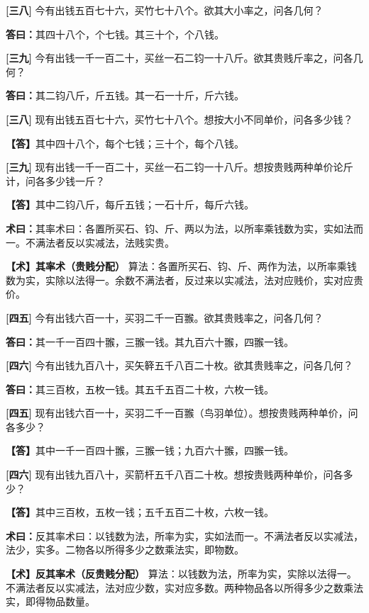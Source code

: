 \documentclass[10pt,a4paper]{article}
\newlength{\lw}
\newlength{\rw}
\newcommand{\bilingc}[2]{%
  \par\vspace{0.1em}%
  \noindent\begin{minipage}[t]{\lw}
  {\small #1}
  \end{minipage}%
  \hfill%
  \begin{minipage}[t]{\rw}
  {\small #2}
  \end{minipage}%
  \vspace{0.1em}%
}
\newcommand{\da}{\textbf{\textcolor{answercolor}{答曰：}}}
\newcommand{\daB}{\textbf{\textcolor{answercolor}{【答】}}}
\newcommand{\shu}{\textbf{\textcolor{methodcolor}{术曰：}}}
\newcommand{\shuB}{\textbf{\textcolor{methodcolor}{【术】}}}
\newcommand{\pn}[1]{\textbf{[#1]}}
\newcommand{\sk}{\vspace{0.1em}}
\begin{document}
\vspace{0.3em}

\bilingc{
\pn{三八} 今有出钱五百七十六，买竹七十八个。欲其大小率之，问各几何？

\da 其四十八个，个七钱。其三十个，个八钱。

\pn{三九} 今有出钱一千一百二十，买丝一石二钧一十八斤。欲其贵贱斤率之，问各几何？

\da 其二钧八斤，斤五钱。其一石一十斤，斤六钱。
}{
\pn{三八} 现有出钱五百七十六，买竹七十八个。想按大小不同单价，问各多少钱？

\daB 其中四十八个，每个七钱；三十个，每个八钱。

\pn{三九} 现有出钱一千一百二十，买丝一石二钧一十八斤。想按贵贱两种单价论斤计，问各多少钱一斤？

\daB 其中二钧八斤，每斤五钱；一石十斤，每斤六钱。
}

\sk

\bilingc{
\shu 其率术曰：各置所买石、钧、斤、两以为法，以所率乘钱数为实，实如法而一。不满法者反以实减法，法贱实贵。
}{
\shuB \textbf{其率术（贵贱分配）} 算法：各置所买石、钧、斤、两作为法，以所率乘钱数为实，实除以法得一。余数不满法者，反过来以实减法，法对应贱价，实对应贵价。
}

\vspace{0.3em}

\bilingc{
\pn{四五} 今有出钱六百一十，买羽二千一百翭。欲其贵贱率之，问各几何？

\da 其一千一百四十翭，三翭一钱。其九百六十翭，四翭一钱。

\pn{四六} 今有出钱九百八十，买矢簳五千八百二十枚。欲其贵贱率之，问各几何？

\da 其三百枚，五枚一钱。其五千五百二十枚，六枚一钱。
}{
\pn{四五} 现有出钱六百一十，买羽二千一百翭（鸟羽单位）。想按贵贱两种单价，问各多少？

\daB 其中一千一百四十翭，三翭一钱；九百六十翭，四翭一钱。

\pn{四六} 现有出钱九百八十，买箭杆五千八百二十枚。想按贵贱两种单价，问各多少？

\daB 其中三百枚，五枚一钱；五千五百二十枚，六枚一钱。
}

\sk

\bilingc{
\shu 反其率术曰：以钱数为法，所率为实，实如法而一。不满法者反以实减法，法少，实多。二物各以所得多少之数乘法实，即物数。
}{
\shuB \textbf{反其率术（反贵贱分配）} 算法：以钱数为法，所率为实，实除以法得一。不满法者反以实减法，法对应少数，实对应多数。两种物品各以所得多少之数乘法实，即得物品数量。
}
\end{document}
